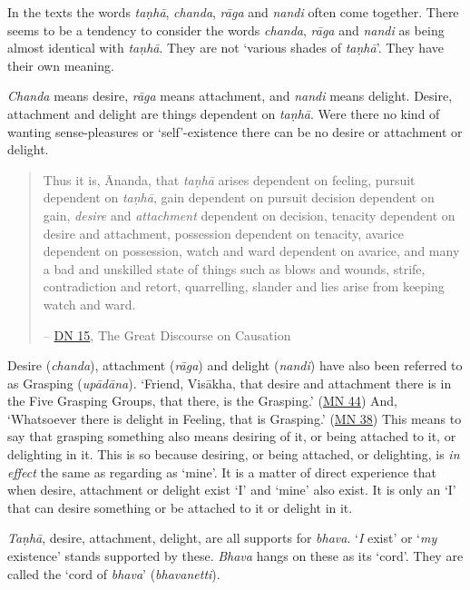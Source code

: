 In the texts the words \textit{taṇhā}, \textit{chanda}, \textit{rāga} and \textit{nandi} often come together. There seems to be a tendency to consider the words \textit{chanda}, \textit{rāga} and \textit{nandi} as being almost identical with \textit{taṇhā}. They are not `various shades of \textit{taṇhā}'. They have their own meaning.

\textit{Chanda} means desire, \textit{rāga} means attachment, and \textit{nandi} means delight. Desire, attachment and delight are things dependent on \textit{taṇhā}. Were there no kind of wanting sense-pleasures or `self'-existence there can be no desire or attachment or delight.

\begin{quote}
Thus it is, Ānanda, that \textit{taṇhā} arises dependent on feeling, pursuit dependent on \textit{taṇhā}, gain dependent on pursuit decision dependent on gain, \emph{desire} and \emph{attachment} dependent on decision, tenacity dependent on desire and attachment, possession dependent on tenacity, avarice dependent on possession, watch and ward dependent on avarice, and many a bad and unskilled state of things such as blows and wounds, strife, contradiction and retort, quarrelling, slander and lies arise from keeping watch and ward.

 -- \href{https://suttacentral.net/dn15/en/bodhi}{DN 15}, The Great Discourse on Causation
\end{quote}

Desire (\textit{chanda}), attachment (\textit{rāga}) and delight (\textit{nandi}) have also been referred to as Grasping (\textit{upādāna}). `Friend, Visākha, that desire and attachment there is in the Five Grasping Groups, that there, is the Grasping.' (\href{https://suttacentral.net/mn44/en/sujato}{MN 44}) And, `Whatsoever there is delight in Feeling, that is Grasping.' (\href{https://suttacentral.net/mn38/en/bodhi}{MN 38}) This means to say that grasping something also means desiring of it, or being attached to it, or delighting in it. This is so because desiring, or being attached, or delighting, is \emph{in effect} the same as regarding as `mine'. It is a matter of direct experience that when desire, attachment or delight exist `I' and `mine' also exist. It is only an `I' that can desire something or be attached to it or delight in it.

\textit{Taṇhā}, desire, attachment, delight, are all supports for \textit{bhava}. `\emph{I} exist' or `\emph{my} existence' stands supported by these. \textit{Bhava} hangs on these as its `cord'. They are called the `cord of \textit{bhava}' (\textit{bhavanetti}).


